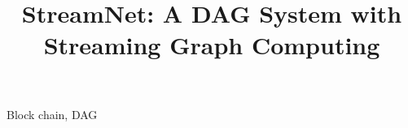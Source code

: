 \documentclass[10pt, conference, compsocconf]{IEEEtran}
\begin{document}
\title{StreamNet: A DAG System with Streaming Graph Computing}



\maketitle






\begin{IEEEkeywords}
Block chain, DAG

\end{IEEEkeywords}


\IEEEpeerreviewmaketitle






\end{document}
